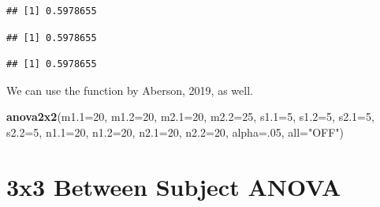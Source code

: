 \documentclass[]{book}
\newenvironment{Shaded}{\begin{snugshade}}{\end{snugshade}}
\newcommand{\DataTypeTok}[1]{\textcolor[rgb]{0.13,0.29,0.53}{#1}}
\newcommand{\DecValTok}[1]{\textcolor[rgb]{0.00,0.00,0.81}{#1}}
\newcommand{\KeywordTok}[1]{\textcolor[rgb]{0.13,0.29,0.53}{\textbf{#1}}}
\newcommand{\NormalTok}[1]{#1}
\newcommand{\OperatorTok}[1]{\textcolor[rgb]{0.81,0.36,0.00}{\textbf{#1}}}
\newcommand{\StringTok}[1]{\textcolor[rgb]{0.31,0.60,0.02}{#1}}
\begin{document}
\begin{verbatim}
## [1] 0.5978655
\end{verbatim}

\begin{Shaded}
\end{Shaded}

\begin{verbatim}
## [1] 0.5978655
\end{verbatim}

\begin{Shaded}
\end{Shaded}

\begin{verbatim}
## [1] 0.5978655
\end{verbatim}

We can use the function by Aberson, 2019, as well.

\begin{Shaded}
\begin{Highlighting}[]
\KeywordTok{anova2x2}\NormalTok{(}\DataTypeTok{m1.1=}\DecValTok{20}\NormalTok{,}
         \DataTypeTok{m1.2=}\DecValTok{20}\NormalTok{,}
         \DataTypeTok{m2.1=}\DecValTok{20}\NormalTok{,}
         \DataTypeTok{m2.2=}\DecValTok{25}\NormalTok{, }
         \DataTypeTok{s1.1=}\DecValTok{5}\NormalTok{,}
         \DataTypeTok{s1.2=}\DecValTok{5}\NormalTok{,}
         \DataTypeTok{s2.1=}\DecValTok{5}\NormalTok{,}
         \DataTypeTok{s2.2=}\DecValTok{5}\NormalTok{,}
         \DataTypeTok{n1.1=}\DecValTok{20}\NormalTok{,}
         \DataTypeTok{n1.2=}\DecValTok{20}\NormalTok{,}
         \DataTypeTok{n2.1=}\DecValTok{20}\NormalTok{,}
         \DataTypeTok{n2.2=}\DecValTok{20}\NormalTok{, }
         \DataTypeTok{alpha=}\NormalTok{.}\DecValTok{05}\NormalTok{, }
         \DataTypeTok{all=}\StringTok{"OFF"}\NormalTok{)}
\end{Highlighting}
\end{Shaded}

\hypertarget{x3-between-subject-anova}{%
\section{3x3 Between Subject ANOVA}\label{x3-between-subject-anova}}
\end{document}
